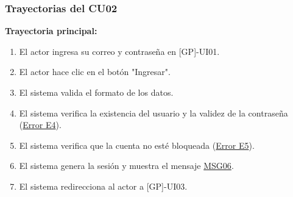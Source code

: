\begin{appendices}
\subsubsection{Trayectorias del CU02}
\textbf{Trayectoria principal:}
\begin{enumerate}[nosep]
    \item El actor ingresa su correo y contraseña en [GP]-UI01.
    \item El actor hace clic en el botón "Ingresar".
    \item El sistema valida el formato de los datos.
    \item El sistema verifica la existencia del usuario y la validez de la contraseña (\hyperlink{err:E4}{Error E4}).
    \item El sistema verifica que la cuenta no esté bloqueada (\hyperlink{err:E5}{Error E5}).
    \item El sistema genera la sesión y muestra el mensaje \hyperlink{msg:MSG06}{MSG06}.
    \item El sistema redirecciona al actor a [GP]-UI03.
\end{enumerate}


\end{appendices}
